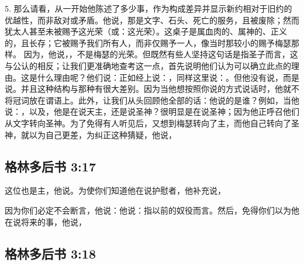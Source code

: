 5. 那么请看，从一开始他陈述了多少事，作为构成差异并显示新约相对于旧约的优越性，而非敌对或矛盾。他说，那是文字、石头、死亡的服务，且被废除；然而犹太人甚至未被赐予这光荣（或：这光荣）。这桌子是属血肉的、属神的、正义的，且长存；它被赐予我们所有人，而非仅赐予一人，像当时那较小的赐予梅瑟那样。 因为，他说，，不是梅瑟的光荣。但既然有些人坚持这句话是指圣子而言，这与公认的相反；让我们更准确地查考这一点，首先说明他们认为可以确立此点的理由。这是什么理由呢？他们说：正如经上说：，同样这里说：。但他没有说，而是说。并且这种结构与那种有很大差别。因为当他想按照你说的方式说话时，他就不将冠词放在谓语上。此外，让我们从头回顾他全部的话：他说的是谁？例如，当他说：，以及，他是在说天主，还是说圣神？很明显是在说圣神；因为他正呼召他们从文字转向圣神。为了免得有人听见后，又想到梅瑟转向了主，而他自己转向了圣神，就以为自己更差，为纠正这种猜疑，他说，\par


\subsection{格林多后书 3:17}

这位也是主，他说。为使你们知道他在说护慰者，他补充说，\par

\par

因为你们必定不会断言，他说：他说：指以前的奴役而言。然后，免得你们以为他在说将来的事，他说，\par


\subsection{格林多后书 3:18}

\par

